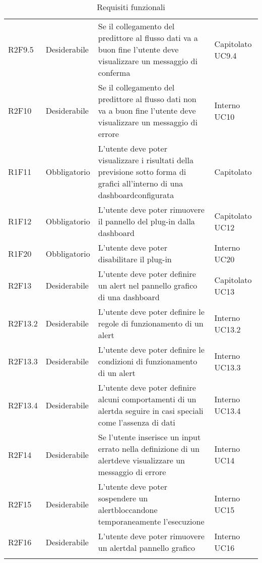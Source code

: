 \begin{longtable} {
		>{}p{24mm} 
		>{}p{32mm}
		>{}p{40mm} 
		>{}p{24.5mm}
		}
		R2F9.5 & Desiderabile & Se il collegamento del predittore al flusso dati va a buon fine l'utente deve visualizzare un messaggio di conferma & Capitolato UC9.4 \TBstrut \\ [2mm]
		R2F10 & Desiderabile & Se il collegamento del predittore al flusso dati non va a buon fine l'utente deve visualizzare un messaggio di errore & Interno UC10 \TBstrut \\ [2mm]
		R1F11 & Obbligatorio & L'utente deve poter visualizzare i risultati della previsione sotto forma di grafici all'interno di una dashboard\glosp configurata & Capitolato \TBstrut \\ [2mm]
		R1F12 & Obbligatorio & L'utente deve poter rimuovere il pannello del plug-in dalla dashboard\glo & Capitolato UC12 \TBstrut \\ [2mm]	
		R1F20 & Obbligatorio & L'utente deve poter disabilitare il plug-in & Interno UC20 \TBstrut \\ [2mm]	
		R2F13 &	Desiderabile & L'utente deve poter definire un alert nel pannello grafico di una dashboard\glo & Capitolato UC13 \TBstrut \\ [2mm]					
		R2F13.2 & Desiderabile & L'utente deve poter definire le regole di funzionamento di un alert\glo & Interno UC13.2 \TBstrut \\ [2mm]		
		R2F13.3 & Desiderabile & L'utente deve poter definire le condizioni di funzionamento di un alert\glo & Interno UC13.3 \TBstrut \\ [2mm]
		R2F13.4 & Desiderabile & L'utente deve poter definire alcuni comportamenti di un alert\glosp da seguire in casi speciali come l'assenza di dati & Interno UC13.4 \TBstrut \\ [2mm]		
		R2F14 &	Desiderabile & Se l'utente inserisce un input errato nella definizione di un alert\glosp deve visualizzare un messaggio di errore & Interno UC14 \TBstrut \\ [2mm]
		R2F15 &	Desiderabile & L'utente deve poter sospendere un alert\glosp bloccandone temporaneamente l'esecuzione & Interno UC15 \TBstrut \\ [2mm]		
		R2F16 & Desiderabile & L'utente deve poter rimuovere un alert\glosp dal pannello grafico & Interno UC16 \TBstrut \\ [2mm]	
		\rowcolor{white}
		\caption{Requisiti funzionali}
	\end{longtable}